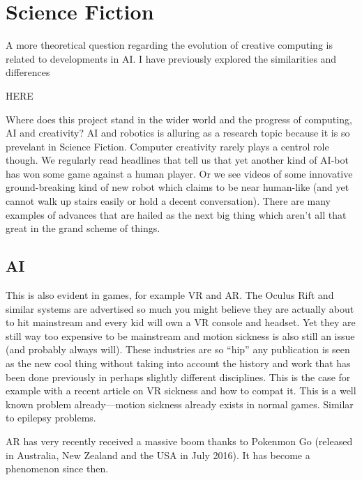 \section{Science Fiction}

A more theoretical question regarding the evolution of creative computing is related to developments in \ac{AI}. I have previously explored the similarities and differences 

HERE

Where does this project stand in the wider world and the progress of computing, \ac{AI} and creativity? \ac{AI} and robotics is alluring as a research topic because it is so prevelant in Science Fiction. Computer creativity rarely plays a centrol role though. We regularly read headlines that tell us that yet another kind of \ac{AI}-bot has won some game against a human player. Or we see videos of some innovative ground-breaking kind of new robot which claims to be near human-like (and yet cannot walk up stairs easily or hold a decent conversation). There are many examples of advances that are hailed as the next big thing which aren't all that great in the grand scheme of things. 

\subsection{AI}
This is also evident in games, for example \ac{VR} and \ac{AR}. The Oculus Rift and similar systems are advertised so much you might believe they are actually about to hit mainstream and every kid will own a \ac{VR} console and headset. Yet they are still way too expensive to be mainstream and motion sickness is also still an issue (and probably always will). These industries are so ``hip'' any publication is seen as the new cool thing without taking into account the history and work that has been done previously in perhaps slightly different disciplines. This is the case for example with a recent article on \ac{VR} sickness and how to compat it. This is a well known problem already---motion sickness already exists in normal games. Similar to epilepsy problems.


\ac{AR} has very recently received a massive boom thanks to Pokenmon Go (released in Australia, New Zealand and the USA in July 2016). It has become a phenomenon since then.

